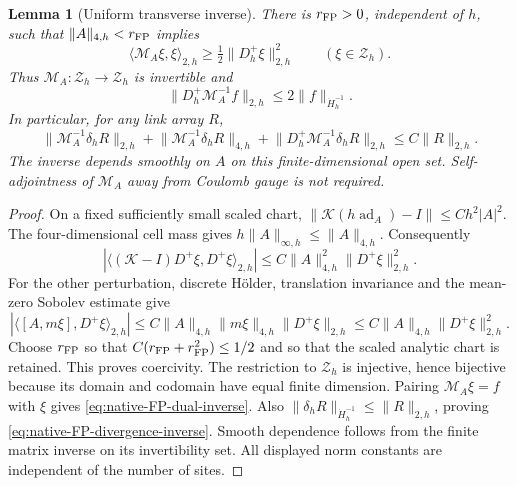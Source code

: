 \documentclass[11pt]{article}
\numberwithin{equation}{section}
\newtheorem{lemma}[lemma]{Lemma}
\theoremstyle{definition}
\theoremstyle{remark}
\newcommand{\norm}[1]{\lVert#1\rVert}
\begin{document}
\begin{lemma}[Uniform transverse inverse]
\label{lem:native-FP-inverse}
There is $r_{\rm FP}>0$, independent of $h$, such that
$\norm A_{4,h}<r_{\rm FP}$ implies
\begin{equation}
 \langle\mathcal M_A\xi,\xi\rangle_{2,h}
 \ge\tfrac12\norm{D_h^+\xi}_{2,h}^2\qquad(\xi\in\mathcal Z_h).
 \label{eq:native-FP-coercivity}
\end{equation}
Thus $\mathcal M_A:\mathcal Z_h\to\mathcal Z_h$ is invertible and
\begin{equation}
 \norm{D_h^+\mathcal M_A^{-1}f}_{2,h}
       \le2\norm f_{\dot H_h^{-1}}.
 \label{eq:native-FP-dual-inverse}
\end{equation}
In particular, for any link array $R$,
\begin{equation}
 \norm{\mathcal M_A^{-1}\delta_hR}_{2,h}
 +\norm{\mathcal M_A^{-1}\delta_hR}_{4,h}
 +\norm{D_h^+\mathcal M_A^{-1}\delta_hR}_{2,h}
 \le C\norm R_{2,h}.
 \label{eq:native-FP-divergence-inverse}
\end{equation}
The inverse depends smoothly on $A$ on this finite-dimensional open set.
Self-adjointness of $\mathcal M_A$ away from Coulomb gauge is not required.
\end{lemma}
\begin{proof}
On a fixed sufficiently small scaled chart,
$\norm{\mathcal K(h\operatorname{ad}_A)-I}\le Ch^2|A|^2$.
The four-dimensional cell mass gives
$h\norm A_{\infty,h}\le\norm A_{4,h}$. Consequently
\[
 |\langle(\mathcal K-I)D^+\xi,D^+\xi\rangle_{2,h}|
 \le C\norm A_{4,h}^2\norm{D^+\xi}_{2,h}^2.
\]
For the other perturbation, discrete H\"older, translation invariance and
the mean-zero Sobolev estimate give
\[
 |\langle[A,m\xi],D^+\xi\rangle_{2,h}|
 \le C\norm A_{4,h}\norm{m\xi}_{4,h}\norm{D^+\xi}_{2,h}
 \le C\norm A_{4,h}\norm{D^+\xi}_{2,h}^2.
\]
Choose $r_{\rm FP}$ so that $C(r_{\rm FP}+r_{\rm FP}^2)\le1/2$ and so
that the scaled analytic chart is retained. This proves coercivity.
The restriction to $\mathcal Z_h$ is injective, hence bijective because its
domain and codomain have equal finite dimension. Pairing
$\mathcal M_A\xi=f$ with $\xi$ gives
\eqref{eq:native-FP-dual-inverse}. Also
$\norm{\delta_hR}_{\dot H_h^{-1}}\le\norm R_{2,h}$, proving
\eqref{eq:native-FP-divergence-inverse}. Smooth dependence follows from the
finite matrix inverse on its invertibility set. All displayed norm constants
are independent of the number of sites.
\end{proof}
\end{document}
